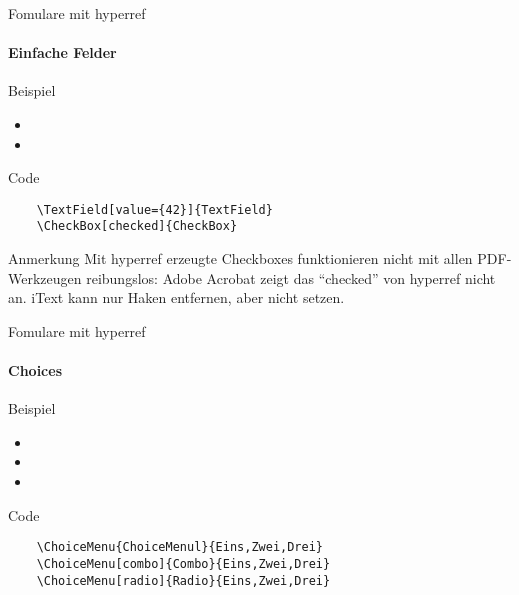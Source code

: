 \documentclass{beamer}
\begin{document}
\begin{frame}[fragile]{Fomulare mit hyperref}
\framesubtitle{Einfache Felder}
\begin{block}{Beispiel}
\begin{itemize}
	\item {}
	\item {}
\end{itemize}
\end{block}
\begin{block}{Code}
\begin{verbatim}
	\TextField[value={42}]{TextField}
	\CheckBox[checked]{CheckBox}
\end{verbatim}
\end{block}
\begin{block}{Anmerkung}
Mit hyperref erzeugte Checkboxes funktionieren nicht mit allen PDF-Werkzeugen reibungslos: Adobe Acrobat zeigt das \enquote{checked} von hyperref nicht an. iText kann nur Haken entfernen, aber nicht setzen.
\end{block}
\end{frame}


\begin{frame}[fragile]{Fomulare mit hyperref}
\framesubtitle{Choices}
\begin{block}{Beispiel}
\begin{Form}
\begin{itemize}
	\item {}
	\item {}
	\item {}
\end{itemize}
\end{Form}
\end{block}
\begin{block}{Code}
\begin{verbatim}
	\ChoiceMenu{ChoiceMenul}{Eins,Zwei,Drei}
	\ChoiceMenu[combo]{Combo}{Eins,Zwei,Drei}
	\ChoiceMenu[radio]{Radio}{Eins,Zwei,Drei}
\end{verbatim}
\end{block}
\end{frame}
\end{document}
